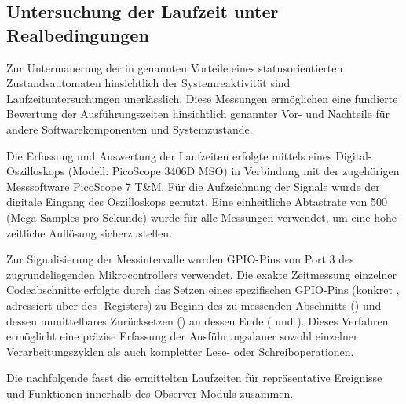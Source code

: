
\subsection{Untersuchung der Laufzeit unter Realbedingungen}
\label{sec:laufzeit}

Zur Untermauerung der in  genannten Vorteile eines statusorientierten Zustandsautomaten hinsichtlich der Systemreaktivit\"at sind Laufzeituntersuchungen unerl\"asslich. Diese Messungen erm\"oglichen eine fundierte Bewertung der Ausf\"uhrungszeiten hinsichtlich genannter Vor- und Nachteile f\"ur andere Softwarekomponenten und Systemzust\"ande.

Die Erfassung und Auswertung der Laufzeiten erfolgte mittels eines Digital-Oszilloskops (Modell: PicoScope 3406D MSO) in Verbindung mit der zugeh\"origen Messsoftware PicoScope 7 T\&M. F\"ur die Aufzeichnung der Signale wurde der digitale Eingang  des Oszilloskops genutzt. Eine einheitliche Abtastrate von 500  (Mega-Samples pro Sekunde) wurde f\"ur alle Messungen verwendet, um eine hohe zeitliche Aufl\"osung sicherzustellen.

Zur Signalisierung der Messintervalle wurden GPIO-Pins von Port 3 des zugrundeliegenden Mikrocontrollers verwendet. Die exakte Zeitmessung einzelner Codeabschnitte erfolgte durch das Setzen eines spezifischen GPIO-Pins (konkret , adressiert \"uber  des -Registers) zu Beginn des zu messenden Abschnitts () und dessen unmittelbares Zur\"ucksetzen () an dessen Ende (\Vgl {} und ). Dieses Verfahren erm\"oglicht eine pr\"azise Erfassung der Ausf\"uhrungsdauer sowohl einzelner Verarbeitungszyklen als auch kompletter Lese- oder Schreiboperationen.

\newpage
Die nachfolgende  fasst die ermittelten Laufzeiten f\"ur repr\"asentative Ereignisse und Funktionen innerhalb des Observer-Moduls zusammen.

